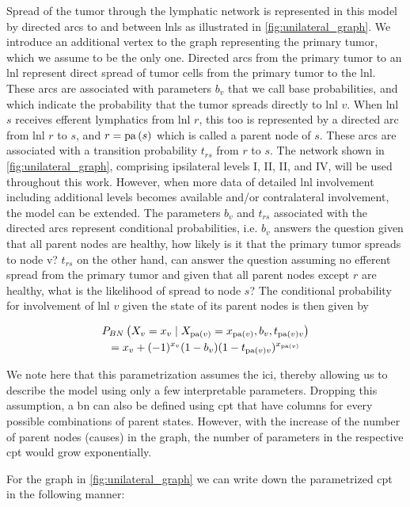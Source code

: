 \documentclass[../ms.tex]{subfiles}
\begin{document}
Spread of the tumor through the lymphatic network is represented in this model by directed arcs to and between \glspl{lnl} as illustrated in \cref{fig:unilateral_graph}. We introduce an additional vertex to the graph representing the primary tumor, which we assume to be the only one. Directed arcs from the primary tumor to an \gls{lnl} represent direct spread of tumor cells from the primary tumor to the \gls{lnl}. These arcs are associated with parameters $b_v$ that we call base probabilities, and which indicate the probability that the tumor spreads directly to \gls{lnl} $v$. When \gls{lnl} $s$ receives efferent lymphatics from \gls{lnl} $r$, this too is represented by a directed arc from \gls{lnl} $r$ to $s$, and $r=\operatorname{pa}{(s)}$ which is called a parent node of $s$. These arcs are associated with a transition probability $t_{rs}$ from $r$ to $s$. The network shown in \cref{fig:unilateral_graph}, comprising ipsilateral levels I, II, II, and IV, will be used throughout this work. However, when more data of detailed \gls{lnl} involvement including additional levels becomes available and/or contralateral involvement, the model can be extended.
The parameters $b_v$ and $t_{rs}$   associated with the directed arcs represent conditional probabilities, i.e. $b_v$ answers the question given that all parent nodes are healthy, how likely is it that the primary tumor spreads to node v? $t_{rs}$   on the other hand, can answer the question assuming no efferent spread from the primary tumor and given that all parent nodes except $r$ are healthy, what is the likelihood of spread to node $s$? The conditional probability for involvement of \gls{lnl} $v$ given the state of its parent nodes is then given by

\begin{multline}
    P_{BN} \left( X_v = x_v \mid X_{\operatorname{pa}(v)} = x_{\operatorname{pa}(v)}, b_v, t_{\operatorname{pa}(v)v} \right) \\
    = x_v + (-1)^{x_v} (1 - b_v) (1 - t_{\operatorname{pa}(v)v})^{x_{\operatorname{pa}(v)}}
\end{multline}

We note here that this parametrization assumes the \gls{ici}, thereby allowing us to describe the model using only a few interpretable parameters. Dropping this assumption, a \gls{bn} can also be defined using \gls{cpt} that have columns for every possible combinations of parent states. However, with the increase of the number of parent nodes (causes) in the graph, the number of parameters in the respective \gls{cpt} would grow exponentially.

For the graph in \cref{fig:unilateral_graph} we can write down the parametrized \gls{cpt} in the following manner:
\end{document}
